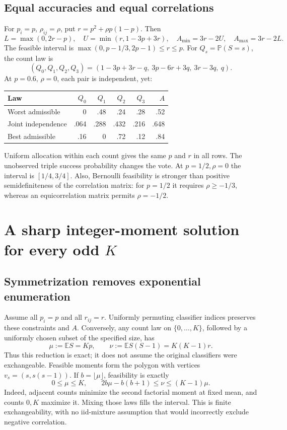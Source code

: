 \documentclass{article}
\newcommand{\Prb}{\mathbb P}
\newcommand{\Ex}{\mathbb E}
\begin{document}
\subsection{Equal accuracies and equal correlations}
For $p_i=p$, $\rho_{ij}=\rho$, put $r=p^2+\rho p(1-p)$. Then
\begin{equation}\label{eq:equal3}
 L=\max(0,2r-p),\quad U=\min(r,1-3p+3r),\quad
 A_{\min}=3r-2U,\quad A_{\max}=3r-2L.
\end{equation}
The feasible interval is $\max(0,p-1/3,2p-1)\le r\le p$.
For $Q_s=\Prb(S=s)$, the count law is
\begin{equation}
 (Q_0,Q_1,Q_2,Q_3)=(1-3p+3r-q,\ 3p-6r+3q,\ 3r-3q,\ q).
\end{equation}
At $p=0.6$, $\rho=0$, each pair is independent, yet:
\begin{center}
\begin{tabular}{@{}lrrrrr@{}}
\toprule
Law & $Q_0$ & $Q_1$ & $Q_2$ & $Q_3$ & $A$\\\midrule
Worst admissible & 0 & .48 & .24 & .28 & .52\\
Joint independence & .064 & .288 & .432 & .216 & .648\\
Best admissible & .16 & 0 & .72 & .12 & .84\\\bottomrule
\end{tabular}
\end{center}
Uniform allocation within each count gives the same $p$ and $r$ in all rows. The unobserved triple success probability changes the vote. At $p=1/2,\rho=0$ the interval is $[1/4,3/4]$. Also, Bernoulli feasibility is stronger than positive semidefiniteness of the correlation matrix: for $p=1/2$ it requires $\rho\ge-1/3$, whereas an equicorrelation matrix permits $\rho=-1/2$.

\clearpage
\section{A sharp integer-moment solution for every odd $K$}
\subsection{Symmetrization removes exponential enumeration}
Assume all $p_i=p$ and all $r_{ij}=r$. Uniformly permuting classifier indices preserves these constraints and $A$. Conversely, any count law on $\{0,\ldots,K\}$, followed by a uniformly chosen subset of the specified size, has
\begin{equation}\label{eq:moments}
 \mu:=\Ex S=Kp,\qquad \nu:=\Ex S(S-1)=K(K-1)r.
\end{equation}
Thus this reduction is exact; it does not assume the original classifiers were exchangeable. Feasible moments form the polygon with vertices $v_s=(s,s(s-1))$. If $b=\lfloor\mu\rfloor$, feasibility is exactly
\begin{equation}\label{eq:feasible}
 0\le\mu\le K,\qquad 2b\mu-b(b+1)\le\nu\le(K-1)\mu.
\end{equation}
Indeed, adjacent counts minimize the second factorial moment at fixed mean, and counts $0,K$ maximize it. Mixing those laws fills the interval. This is finite exchangeability, with no iid-mixture assumption that would incorrectly exclude negative correlation.
\end{document}
